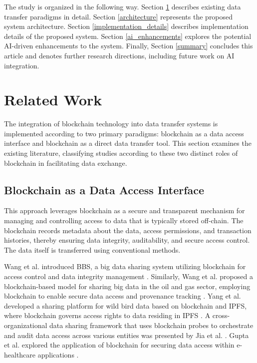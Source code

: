 \documentclass[10pt]{llncs}
\begin{document}
The study is organized in the following way.
Section \ref{related_work} describes existing data transfer paradigms in detail.
Section \ref{architecture} represents the proposed system architecture.
Section \ref{implementation_details} describes implementation details of the proposed system.
Section \ref{ai_enhancements} explores the potential AI-driven enhancements to the system.
Finally, Section \ref{summary} concludes this article and denotes further research directions, including future work on AI integration.

\section{Related Work} \label{related_work}

The integration of blockchain technology into data transfer systems is implemented according to two primary paradigms: blockchain as a data access interface and blockchain as a direct data transfer tool.
This section examines the existing literature, classifying studies according to these two distinct roles of blockchain in facilitating data exchange.

\subsection{Blockchain as a Data Access Interface}

This approach leverages blockchain as a secure and transparent mechanism for managing and controlling access to data that is typically stored off-chain.
The blockchain records metadata about the data, access permissions, and transaction histories, thereby ensuring data integrity, auditability, and secure access control.
The data itself is transferred using conventional methods.

Wang et al. introduced BBS, a big data sharing system utilizing blockchain for access control and data integrity management \cite{Wang2024}.
Similarly, Wang et al. proposed a blockchain-based model for sharing big data in the oil and gas sector, employing blockchain to enable secure data access and provenance tracking \cite{WangYY2021}.
Yang et al. developed a sharing platform for wild bird data based on blockchain and IPFS, where blockchain governs access rights to data residing in IPFS \cite{Yang2022}.
A cross-organizational data sharing framework that uses blockchain probes to orchestrate and audit data access across various entities was presented by Jia et al. \cite{Jia2023}.
Gupta et al. explored the application of blockchain for securing data access within e-healthcare applications \cite{Gupta2022}.
\end{document}
